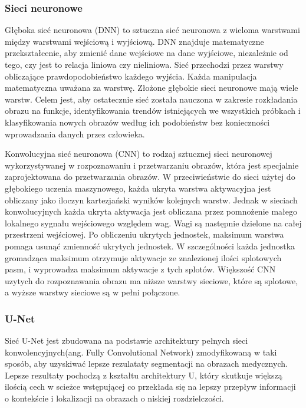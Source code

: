 \documentclass[a4paper,11pt,twoside]{report}
\theoremstyle{definition}
\begin{document}
\subsubsection{Sieci neuronowe}

Głęboka sieć neuronowa (DNN) to sztuczna sieć neuronowa z wieloma warstwami między warstwami wejściową i wyjściową. DNN znajduje matematyczne przekształcenie, aby zmienić dane wejściowe na dane wyjściowe, niezależnie od tego, czy jest to relacja liniowa czy nieliniowa. Sieć przechodzi przez warstwy obliczające prawdopodobieństwo każdego wyjścia. Każda manipulacja matematyczna uważana za warstwę. Złożone głębokie sieci neuronowe mają wiele warstw. Celem jest, aby ostatecznie sieć została nauczona w zakresie rozkładania obrazu na funkcje, identyfikowania trendów istniejących we wszystkich próbkach i klasyfikowania nowych obrazów według ich podobieństw bez konieczności wprowadzania danych przez człowieka.
\par
Konwolucyjna  sieć neuronowa (CNN) to rodzaj sztucznej sieci neuronowej wykorzystywanej w rozpoznawaniu i przetwarzaniu obrazów, która jest specjalnie zaprojektowana do przetwarzania obrazów. W przeciwieństwie do sieci użytej do głębokiego uczenia maszynowego, każda ukryta warstwa aktywacyjna jest obliczany jako iloczyn kartezjański wyników kolejnych warstw. Jednak w sieciach konwolucyjnych każda ukryta aktywacja jest obliczana przez pomnożenie małego lokalnego sygnału wejściowego względem wag. Wagi są następnie dzielone na całej przestrzeni wejściowej. Po obliczeniu ukrytych jednostek, maksimum warstwa pomaga usunąć zmienność ukrytych jednostek. W szczególności każda jednostka gromadząca maksimum otrzymuje aktywacje ze znalezionej ilości splotowych pasm, i wyprowadza maksimum aktywacje z tych splotów. Większość CNN uzytych do rozpoznawania obrazu ma niższe warstwy sieciowe, które są splotowe, a wyższe warstwy sieciowe są w pełni połączone.

\subsubsection{U-Net}
Sieć U-Net jest zbudowana na podstawie architektury pełnych sieci konwolencyjnych(ang. Fully Convolutional Network) zmodyfikowaną w taki sposób, aby uzyskiwać lepsze rezulataty segmentacji na obrazach medycznych. Lepsze rezultaty pochodzą z kształtu architektury U, który skutkuje większą ilością cech w scieżce wstępującej co przekłada się na lepszy przepływ informacji o kontekście i lokalizacji na obrazach o niskiej rozdzielczości.
\end{document}
